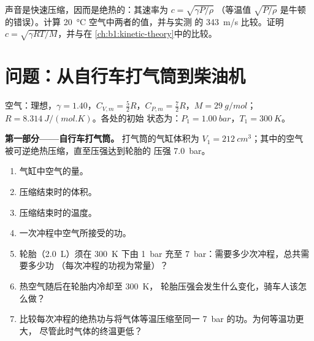 \begin{exercise}[$\star\star\star$]\label{exo:b1:first-law:12}
声音是快速压缩，因而是绝热的：其速率为 $c = \sqrt{\gamma P/\rho}$
（等温值 $\sqrt{P/\rho}$ 是牛顿的错误）。计算
\qty{20}{\degreeCelsius} 空气中两者的值，并与实测
的 \qty{343}{m/s} 比较。证明 $c = \sqrt{\gamma RT/M}$，并与在
\cref{ch:b1:kinetic-theory}中的比较。
\end{exercise}

\section{问题：从自行车打气筒到柴油机}

\begin{problem}
\label{pb:b1:first-law:1}
空气：理想，$\gamma = 1.40$，$C_{V,m} = \tfrac52 R$，$C_{P,m} =
\tfrac72 R$，$M = \qty{29}{g/mol}$；$R = \qty{8.314}{J/(mol.K)}$。各处的初始
状态为：$P_1 = \qty{1.00}{bar}$，$T_1 = \qty{300}{K}$。

\medskip
\noindent\textbf{第一部分——自行车打气筒。}
打气筒的气缸体积为 $V_1 = \qty{212}{cm^3}$；其中的空气
被可逆绝热压缩，直至压强达到轮胎的
压强 \qty{7.0}{bar}。
\begin{enumerate}
  \item 气缸中空气的量。
  \item 压缩结束时的体积。
  \item 压缩结束时的温度。
  \item 一次冲程中空气所接受的功。
  \item 轮胎（\qty{2.0}{L}）须在 \qty{300}{K} 下由 \qty{1}{bar} 充至
        \qty{7}{bar}：需要多少次冲程，总共需要多少功
        （每次冲程的功视为常量）？
  \item 热空气随后在轮胎内冷却至 \qty{300}{K}，
        轮胎压强会发生什么变化，骑车人该怎么做？
  \item 比较每次冲程的绝热功与将气体等温压缩至同一
        \qty{7}{bar} 的功。为何等温功更大，
        尽管此时气体的终温更低？
\end{enumerate}


\end{problem}
